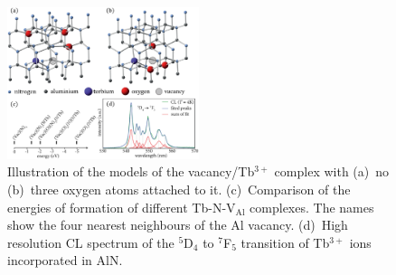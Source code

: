 \documentclass[%
aip,
rsi,%
 amsmath,amssymb,%
 reprint,%
]{revtex4-1}
\begin{document}
\begin{figure}%
	\includegraphics[width=0.5\textwidth]{model}
    \caption{Illustration of the models of the vacancy/Tb$^{3+}$ complex with (a)~no (b)~three oxygen atoms attached to it. (c)~Comparison of the energies of formation of different Tb-N-V$_\text{Al}$ complexes. The names show the four nearest neighbours of the Al vacancy. (d)~High resolution CL spectrum of the $^5$D$_4$ to $^7$F$_5$ transition of Tb$^{3+}$ ions incorporated in AlN.}
    \label{fig:felix_model}
\end{figure}
\end{document}
